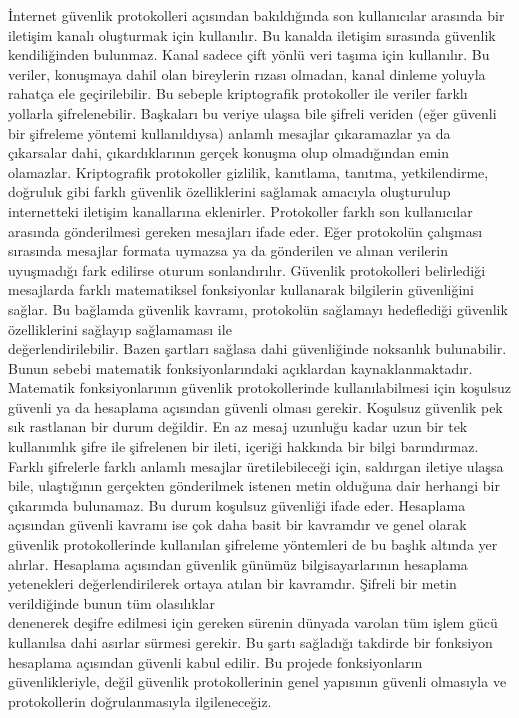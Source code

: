 \documentclass[a4paper, 12pt, titlepage]{article}
\begin{document}
İnternet güvenlik protokolleri açısından bakıldığında son kullanıcılar arasında bir iletişim kanalı oluşturmak için kullanılır. Bu kanalda iletişim sırasında güvenlik kendiliğinden bulunmaz. Kanal sadece çift yönlü veri taşıma için kullanılır. Bu veriler, konuşmaya dahil olan bireylerin rızası olmadan, kanal dinleme yoluyla rahatça ele geçirilebilir. Bu sebeple kriptografik protokoller ile veriler farklı yollarla şifrelenebilir. Başkaları bu veriye ulaşsa bile şifreli veriden (eğer güvenli bir şifreleme yöntemi kullanıldıysa) anlamlı mesajlar çıkaramazlar ya da çıkarsalar dahi, çıkardıklarının gerçek konuşma olup olmadığından emin olamazlar. Kriptografik protokoller gizlilik, kanıtlama, tanıtma, yetkilendirme, doğruluk gibi farklı güvenlik özelliklerini sağlamak amacıyla oluşturulup internetteki iletişim kanallarına eklenirler. Protokoller farklı son kullanıcılar arasında gönderilmesi gereken mesajları ifade eder. Eğer protokolün çalışması sırasında mesajlar formata uymazsa ya da gönderilen ve alınan verilerin uyuşmadığı fark edilirse oturum sonlandırılır. Güvenlik protokolleri belirlediği mesajlarda farklı matematiksel fonksiyonlar kullanarak bilgilerin güvenliğini sağlar. Bu bağlamda güvenlik kavramı, protokolün sağlamayı hedeflediği güvenlik özelliklerini sağlayıp sağlamaması ile \\değerlendirilebilir. Bazen şartları sağlasa dahi güvenliğinde noksanlık bulunabilir. Bunun sebebi matematik fonksiyonlarındaki açıklardan kaynaklanmaktadır. Matematik fonksiyonlarının güvenlik protokollerinde kullanılabilmesi için koşulsuz güvenli ya da hesaplama açısından güvenli olması gerekir. Koşulsuz güvenlik pek sık rastlanan bir durum değildir. En az mesaj uzunluğu kadar uzun bir tek kullanımlık şifre ile şifrelenen bir ileti, içeriği hakkında bir bilgi barındırmaz. Farklı şifrelerle farklı anlamlı mesajlar üretilebileceği için, saldırgan iletiye ulaşsa bile, ulaştığının gerçekten gönderilmek istenen metin olduğuna dair herhangi bir çıkarımda bulunamaz. Bu durum koşulsuz güvenliği ifade eder. Hesaplama açısından güvenli kavramı ise çok daha basit bir kavramdır ve genel olarak güvenlik protokollerinde kullanılan şifreleme yöntemleri de bu başlık altında yer alırlar. Hesaplama açısından güvenlik günümüz bilgisayarlarının hesaplama yetenekleri değerlendirilerek ortaya atılan bir kavramdır. Şifreli bir metin verildiğinde bunun tüm olasılıklar \\denenerek deşifre edilmesi için gereken sürenin dünyada varolan tüm işlem gücü kullanılsa dahi asırlar sürmesi gerekir. Bu şartı sağladığı takdirde bir fonksiyon hesaplama açısından güvenli kabul edilir. Bu projede fonksiyonların güvenlikleriyle, değil güvenlik protokollerinin genel yapısının güvenli olmasıyla ve protokollerin doğrulanmasıyla ilgileneceğiz.
\end{document}
